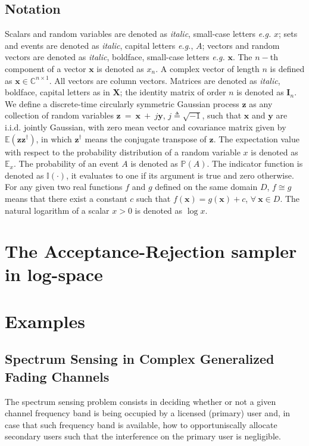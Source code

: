 \documentclass[conference, 10pt]{IEEEtran}
\begin{document}
\subsection*{Notation}
Scalars and random variables are denoted as \textit{italic}, small-case letters
\textit{e.g.} $x$; sets and events are denoted as \textit{italic}, capital
letters \textit{e.g.}, $A$; vectors and random vectors are denoted as
\textit{italic}, boldface, small-case letters \textit{e.g.} $\bm{x}$. The $n-$th
component of a vector $\bm{x}$ is denoted as $x_n$. A complex vector of length
$n$ is defined as $\bm{x} \in \mathbb{C}^{n\times 1}$. All vectors are column
vectors. Matrices are denoted as \textit{italic}, boldface, capital letters as
in $\bm{X}$; the identity matrix of order $n$ is denoted as $\bm{I}_n$. We
define a discrete-time circularly symmetric Gaussian process $\bm{z}$ as any
collection of random variables $\bm{z}~=~\bm{x}~+~j\bm{y}$,
$j \triangleq \sqrt{-1}$, such that $\bm{x}$ and $\bm{y}$ are i.i.d. jointly
Gaussian, with zero mean vector and covariance matrix given by
$\mathbb{E}\left(\bm{z}\bm{z}^{\dagger}\right)$, in which $\bm{z}^\dagger$ means
the conjugate transpose of $\bm{z}$. The expectation value with respect to the
probability distribution of a random variable $x$ is denoted as $\mathbb{E}_x$.
The probability of an event $A$ is denoted as $\mathbb{P}(A)$. The indicator
function is denoted as $\mathbb{I}(\cdot)$, it evaluates to one if its argument
is true and zero otherwise. For any given two real functions $f$ and $g$ defined
on the same domain $D$, $f \cong g$ means that there exist a constant $c$ such that
$f(\bm{x}) = g(\bm{x}) + c$, $\forall~ \bm{x} \in D$. The natural logarithm of a
scalar $x > 0$ is denoted as $\log x$.

\section{The Acceptance-Rejection sampler in log-space}

\section{Examples}
\subsection{Spectrum Sensing in Complex Generalized Fading Channels}

The spectrum sensing problem consists in deciding whether or not a given channel
frequency band is being occupied by a licensed (primary) user and, in case that such
frequency band is available, how to opportuniscally allocate secondary users
such that the interference on the primary user is negligible.
\end{document}
